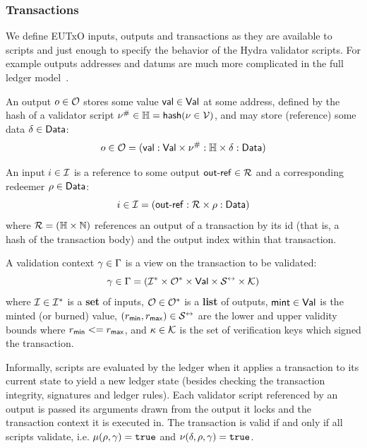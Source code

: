 \subsubsection{Transactions}

We define EUTxO inputs, outputs and transactions as they are available to
scripts and just enough to specify the behavior of the Hydra validator scripts.
For example outputs addresses and datums are much more complicated in the full
ledger model~\cite{eutxo-2, ledger-shelley-spec}.

\begin{definition}[Outputs]
	An output $o \in \mathcal{O}$ stores some value $\mathsf{val} \in \mathsf{Val}$ at some address,
	defined by the hash of a validator script $\nu^{\#} \in \mathbb{H} = \mathsf{hash}(\nu \in \mathcal{V})$,
	and may store (reference) some data $\delta \in \mathsf{Data}$:
	\[
		o \in \mathcal{O} = (\mathsf{val} : \mathsf{Val} \times \nu^{\#} : \mathbb{H} \times \delta : \mathsf{Data})
	\]
\end{definition}

\begin{definition}[Inputs]
	An input $i \in \mathcal{I}$ is a reference to some output
	$\mathsf{out\textsf{-}{}ref} \in \mathcal{R}$ and a corresponding redeemer $\rho \in \mathsf{Data}$:
	\[
		i \in \mathcal{I} = (\mathsf{out\textsf{-}{}ref} : \mathcal{R} \times \rho : \mathsf{Data})
	\]
	where $\mathcal{R} = (\mathbb{H} \times \mathbb{N})$ references an output of a
	transaction by its id (that is, a hash of the transaction body) and the output
	index within that transaction.
\end{definition}

\begin{definition}
	A validation context $\gamma \in \Gamma$ is a view on the transaction
	to be validated:
	\[
		\gamma \in \Gamma = (\mathcal{I}^* \times \mathcal{O}^* \times \mathsf{Val} \times \mathcal{S}^{\leftrightarrow} \times \mathcal{K})
	\]
	where $\mathcal{I} \in \mathcal{I}^*$ is a \textbf{set} of inputs,
	$\mathcal{O} \in \mathcal{O}^*$ is a \textbf{list} of outputs,
	$\mathsf{mint} \in \mathsf{Val}$ is the minted (or burned) value,
	$(r_{\mathsf{min}}, r_{\mathsf{max}}) \in \mathcal{S}^{\leftrightarrow}$
	 are
	the lower and upper validity bounds where $r_{\mathsf{min}} <= r_{\mathsf{max}}$, and $\kappa \in \mathcal{K}$ is the set
	of verification keys which signed the transaction.
\end{definition}

Informally, scripts are evaluated by the ledger when it applies a transaction to
its current state to yield a new ledger state (besides checking the transaction
integrity, signatures and ledger rules). Each validator script referenced by
an output is passed its arguments drawn from the output it locks and the
transaction context it is executed in. The transaction is valid if and only if
all scripts validate, i.e. $\mu(\rho, \gamma) = \mathtt{true}$ and
$\nu(\delta, \rho, \gamma) = \mathtt{true}$.

